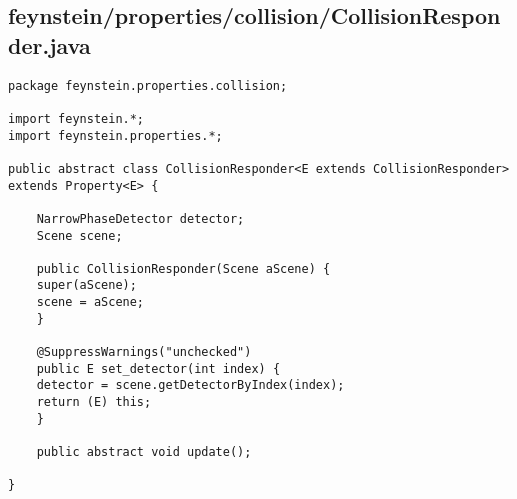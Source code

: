 \subsection*{feynstein/properties/collision/CollisionResponder.java}
\begin{lstlisting}
package feynstein.properties.collision;

import feynstein.*;
import feynstein.properties.*;

public abstract class CollisionResponder<E extends CollisionResponder> extends Property<E> {
    
    NarrowPhaseDetector detector;
    Scene scene;

    public CollisionResponder(Scene aScene) {
	super(aScene);
	scene = aScene;
    }

    @SuppressWarnings("unchecked")
    public E set_detector(int index) {
	detector = scene.getDetectorByIndex(index);
	return (E) this;
    }

    public abstract void update();

}\end{lstlisting}

